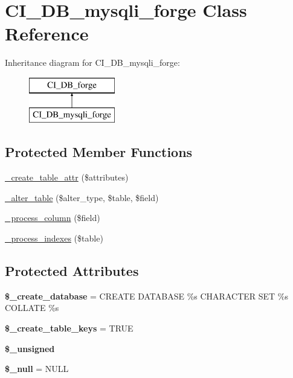 \hypertarget{class_c_i___d_b__mysqli__forge}{}\section{C\+I\+\_\+\+D\+B\+\_\+mysqli\+\_\+forge Class Reference}
\label{class_c_i___d_b__mysqli__forge}
Inheritance diagram for C\+I\+\_\+\+D\+B\+\_\+mysqli\+\_\+forge\+:\begin{figure}[H]
\begin{center}
\leavevmode
\includegraphics[height=2.000000cm]{class_c_i___d_b__mysqli__forge}
\end{center}
\end{figure}
\subsection*{Protected Member Functions}
\begin{DoxyCompactItemize}
\item 
\mbox{\hyperlink{class_c_i___d_b__mysqli__forge_a0527ed4dfaa914865a165d83cead13fe}{\+\_\+create\+\_\+table\+\_\+attr}} (\$attributes)
\item 
\mbox{\hyperlink{class_c_i___d_b__mysqli__forge_ae8fed9a6d4ade09bb4cfa5b29541afd2}{\+\_\+alter\+\_\+table}} (\$alter\+\_\+type, \$table, \$field)
\item 
\mbox{\hyperlink{class_c_i___d_b__mysqli__forge_aa50b0244f2629814dbd57446f6fc77b0}{\+\_\+process\+\_\+column}} (\$field)
\item 
\mbox{\hyperlink{class_c_i___d_b__mysqli__forge_ac228725d7373cba7cf1e69b736b310bf}{\+\_\+process\+\_\+indexes}} (\$table)
\end{DoxyCompactItemize}
\subsection*{Protected Attributes}
\begin{DoxyCompactItemize}
\item 
\mbox{\label{class_c_i___d_b__mysqli__forge_a7d10d568a780ca48265e48d601ef5bfa}} 
{\bfseries \$\+\_\+create\+\_\+database} = \textquotesingle{}C\+R\+E\+A\+TE D\+A\+T\+A\+B\+A\+SE \%s C\+H\+A\+R\+A\+C\+T\+ER S\+ET \%s C\+O\+L\+L\+A\+TE \%s\textquotesingle{}
\item 
\mbox{\label{class_c_i___d_b__mysqli__forge_aea577870d8e0fa52d9e9df16b38da95b}} 
{\bfseries \$\+\_\+create\+\_\+table\+\_\+keys} = T\+R\+UE
\item 
{\bfseries \$\+\_\+unsigned}
\item 
\mbox{\label{class_c_i___d_b__mysqli__forge_aeb9510628e7e51efaa0b2ab41a646489}} 
{\bfseries \$\+\_\+null} = \textquotesingle{}N\+U\+LL\textquotesingle{}
\end{DoxyCompactItemize}
